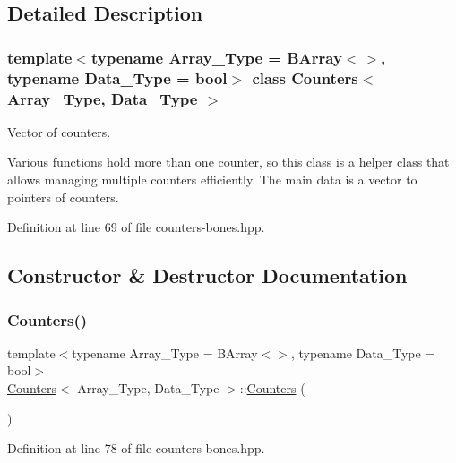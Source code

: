 \subsection{Detailed Description}
\subsubsection*{template$<$typename Array\+\_\+\+Type = B\+Array$<$$>$, typename Data\+\_\+\+Type = bool$>$\newline
class Counters$<$ Array\+\_\+\+Type, Data\+\_\+\+Type $>$}

Vector of counters. 

Various functions hold more than one counter, so this class is a helper class that allows managing multiple counters efficiently. The main data is a vector to pointers of counters. 

Definition at line 69 of file counters-\/bones.\+hpp.



\subsection{Constructor \& Destructor Documentation}
\mbox{\label{class_counters_a98e4efd06b3d878609911e392a8f42ce}} 
\subsubsection{\texorpdfstring{Counters()}{Counters()}\hspace{0.1cm}{\footnotesize\ttfamily [1/2]}}
{\footnotesize\ttfamily template$<$typename Array\+\_\+\+Type = B\+Array$<$$>$, typename Data\+\_\+\+Type = bool$>$ \\
\hyperlink{class_counters}{Counters}$<$ Array\+\_\+\+Type, Data\+\_\+\+Type $>$\+::\hyperlink{class_counters}{Counters} (\begin{DoxyParamCaption}{ }\end{DoxyParamCaption})\hspace{0.3cm}{\ttfamily [inline]}}



Definition at line 78 of file counters-\/bones.\+hpp.

\mbox{\label{class_counters_a6ce3fa5d32d646efb5d83fa1feaf5e95}} 
